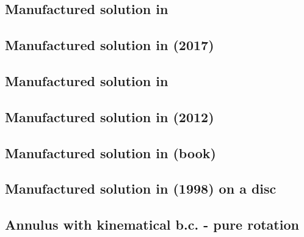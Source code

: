 \subsection{Manufactured solution in \textcite{jolm17}  \label{ss:mms_jolm17}}







\subsection{Manufactured solution in \textcite{lami17} (2017) \label{ss:mms11}}


\subsection{Manufactured solution in \textcite{muye17}} \label{ss:mms_muye17a}


\subsection{Manufactured solution in \textcite{bocg12} (2012)} \label{ss:mms_bocg12}


\subsection{Manufactured solution in \textcite{john16} (book)} \label{ss:mms_johnbook}


\subsection{Manufactured solution in \textcite{john98} (1998) on a disc} \label{ss:mms_john98}


\subsection{Annulus with kinematical b.c. - pure rotation} \label{ss:ankbc}

